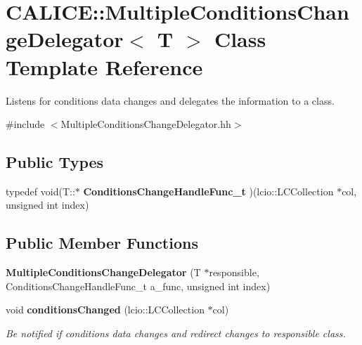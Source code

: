 \section{CALICE::MultipleConditionsChangeDelegator$<$ T $>$ Class Template Reference}
\label{classCALICE_1_1MultipleConditionsChangeDelegator}


Listens for conditions data changes and delegates the information to a class.  


{\ttfamily \#include $<$MultipleConditionsChangeDelegator.hh$>$}\subsection*{Public Types}
\begin{DoxyCompactItemize}
\item 
typedef void(T::$\ast$ {\bfseries ConditionsChangeHandleFunc\_\-t} )(lcio::LCCollection $\ast$col, unsigned int index)\label{classCALICE_1_1MultipleConditionsChangeDelegator_af8e908739880440829d0055c2ec360fa}

\end{DoxyCompactItemize}
\subsection*{Public Member Functions}
\begin{DoxyCompactItemize}
\item 
{\bfseries MultipleConditionsChangeDelegator} (T $\ast$responsible, ConditionsChangeHandleFunc\_\-t a\_\-func, unsigned int index)\label{classCALICE_1_1MultipleConditionsChangeDelegator_a90c159262e4f9ef11d0c3ede5d90516c}

\item 
void {\bf conditionsChanged} (lcio::LCCollection $\ast$col)
\begin{DoxyCompactList}\small\item\em Be notified if conditions data changes and redirect changes to responsible class. \item\end{DoxyCompactList}\end{DoxyCompactItemize}
